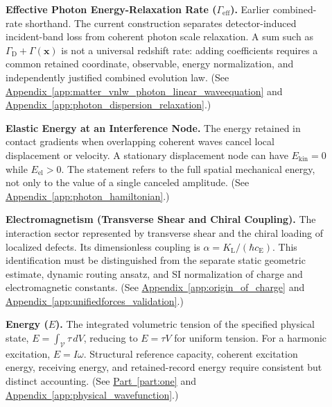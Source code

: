 \begin{description}
\item[] \begin{minipage}[t]{\linewidth}
\textbf{Effective Photon Energy-Relaxation Rate ($\Gamma_{\mathrm{eff}}$).} Earlier combined-rate shorthand. The current construction separates detector-induced incident-band loss from coherent photon scale relaxation. A sum such as $\Gamma_{\mathrm D}+\Gamma(\mathbf x)$ is not a universal redshift rate: adding coefficients requires a common retained coordinate, observable, energy normalization, and independently justified combined evolution law.
(See \hyperref[app:matter_vnlw_photon_linear_waveequation]{Appendix~\ref*{app:matter_vnlw_photon_linear_waveequation}} and \hyperref[app:photon_dispersion_relaxation]{Appendix~\ref*{app:photon_dispersion_relaxation}}.)
\end{minipage}

\item[] \begin{minipage}[t]{\linewidth}
\textbf{Elastic Energy at an Interference Node.} The energy retained in contact gradients when overlapping coherent waves cancel local displacement or velocity. A stationary displacement node can have $E_{\mathrm{kin}}=0$ while $E_{\mathrm{el}}>0$. The statement refers to the full spatial mechanical energy, not only to the value of a single canceled amplitude.
(See \hyperref[app:photon_hamiltonian]{Appendix~\ref*{app:photon_hamiltonian}}.)
\end{minipage}

\item[] \begin{minipage}[t]{\linewidth}
\textbf{Electromagnetism (Transverse Shear and Chiral Coupling).} The interaction sector represented by transverse shear and the chiral loading of localized defects. Its dimensionless coupling is $\alpha=K_{\mathrm L}/(\hbar c_{\mathrm E})$. This identification must be distinguished from the separate static geometric estimate, dynamic routing ansatz, and SI normalization of charge and electromagnetic constants.
(See \hyperref[app:origin_of_charge]{Appendix~\ref*{app:origin_of_charge}} and \hyperref[app:unifiedforces_validation]{Appendix~\ref*{app:unifiedforces_validation}}.)
\end{minipage}

\item[] \begin{minipage}[t]{\linewidth}
\textbf{Energy ($E$).} The integrated volumetric tension of the specified physical state, $E=\int_{\mathcal V}\tau\,dV$, reducing to $E=\tau V$ for uniform tension. For a harmonic excitation, $E=I\omega$. Structural reference capacity, coherent excitation energy, receiving energy, and retained-record energy require consistent but distinct accounting.
(See \hyperref[part:one]{Part~\ref*{part:one}} and \hyperref[app:physical_wavefunction]{Appendix~\ref*{app:physical_wavefunction}}.)
\end{minipage}


\end{description}
